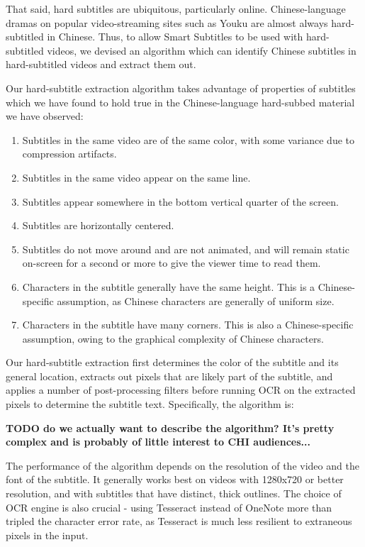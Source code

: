 \documentclass{sigchi}
\begin{document}
That said, hard subtitles are ubiquitous, particularly online. Chinese-language dramas on popular video-streaming sites such as Youku are almost always hard-subtitled in Chinese. Thus, to allow Smart Subtitles to be used with hard-subtitled videos, we devised an algorithm which can identify Chinese subtitles in hard-subtitled videos and extract them out.

Our hard-subtitle extraction algorithm takes advantage of properties of subtitles which we have found to hold true in the Chinese-language hard-subbed material we have observed:

\begin{enumerate}[noitemsep]
\item Subtitles in the same video are of the same color, with some variance due to compression artifacts.
\item Subtitles in the same video appear on the same line.
\item Subtitles appear somewhere in the bottom vertical quarter of the screen.
\item Subtitles are horizontally centered.
\item Subtitles do not move around and are not animated, and will remain static on-screen for a second or more to give the viewer time to read them.
\item Characters in the subtitle generally have the same height. This is a Chinese-specific assumption, as Chinese characters are generally of uniform size.
\item Characters in the subtitle have many corners. This is also a Chinese-specific assumption, owing to the graphical complexity of Chinese characters.
\end{enumerate}

Our hard-subtitle extraction first determines the color of the subtitle and its general location, extracts out pixels that are likely part of the subtitle, and applies a number of post-processing filters before running OCR on the extracted pixels to determine the subtitle text. Specifically, the algorithm is:

\textbf{TODO do we actually want to describe the algorithm? It's pretty complex
and is probably of little interest to CHI audiences...}

The performance of the algorithm depends on the resolution of the video and
the font of the subtitle. It generally works best on videos with 1280x720 or better resolution, and with subtitles that have distinct, thick outlines. The choice of OCR engine is also crucial - using Tesseract instead of OneNote more than tripled the character error rate,
as Tesseract is much less resilient to extraneous pixels in the input.
\end{document}
